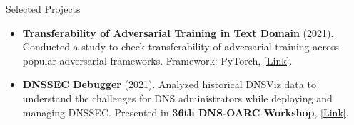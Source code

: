 \documentclass[]{mcdowellcv}
\begin{document}
	\begin{cvsection}{Selected Projects}
		\begin{cvsubsection}{}{}{}
			\begin{itemize}
				\item \textbf{Transferability of Adversarial Training in Text Domain} (2021). Conducted a study to check transferability of adversarial training across popular adversarial frameworks. Framework: PyTorch, \href{https://github.com/Ashiq5/AdvTrainingExperiment}{[Link]}.
				\item \textbf{DNSSEC Debugger} (2021). Analyzed historical DNSViz data to understand the challenges for DNS administrators while deploying and managing DNSSEC. Presented in \textbf{36th DNS-OARC Workshop}, \href{https://indico.dns-oarc.net/event/40/contributions/891/attachments/857/1555/DNS-OARC-final.pdf}{[Link]}.
			\end{itemize}
		\end{cvsubsection}
	\end{cvsection}
\end{document}
